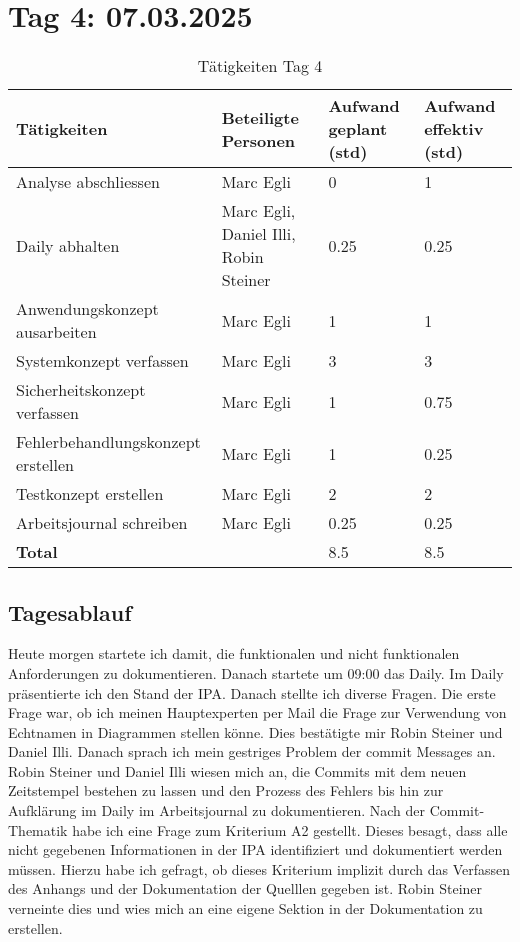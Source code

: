 \section{Tag 4: 07.03.2025}
\begin{table}[H]
    \begin{tabular}{|L{0.4\textwidth}|C{60pt}|C{60pt}|C{60pt}|}
        \hline
        \color{white}Tätigkeiten & \color{white}Beteiligte \color{white}Personen & \color{white}Aufwand geplant (std) & \color{white}Aufwand effektiv (std) \\
        \hline
        Analyse abschliessen & Marc Egli & 0 & 1 \\
        \hline
        Daily abhalten & Marc Egli, Daniel Illi, Robin Steiner & 0.25 & 0.25 \\
        \hline
        Anwendungskonzept ausarbeiten & Marc Egli & 1 & 1 \\
        \hline
        Systemkonzept verfassen & Marc Egli & 3 & 3 \\
        \hline
        Sicherheitskonzept verfassen & Marc Egli & 1 & 0.75 \\
        \hline
        Fehlerbehandlungskonzept erstellen & Marc Egli & 1 & 0.25 \\
        \hline
        Testkonzept erstellen & Marc Egli & 2 & 2 \\
        \hline
        Arbeitsjournal schreiben & Marc Egli & 0.25 & 0.25 \\
        \hline
        \textbf{Total} &  & 8.5 & 8.5 \\
    \hline
    \end{tabular}
    \caption{Tätigkeiten Tag 4}
\end{table}

\subsection*{Tagesablauf}
Heute morgen startete ich damit, die funktionalen und nicht funktionalen Anforderungen zu dokumentieren. 
Danach startete um 09:00 das Daily. Im Daily präsentierte ich den Stand der IPA. Danach stellte ich diverse Fragen. Die
erste Frage war, ob ich meinen Hauptexperten per Mail die Frage zur Verwendung von Echtnamen in Diagrammen stellen könne. Dies
bestätigte mir Robin Steiner und Daniel Illi. Danach sprach ich mein gestriges Problem der commit Messages an. Robin Steiner und Daniel Illi
wiesen mich an, die Commits mit dem neuen Zeitstempel bestehen zu lassen und den Prozess des Fehlers bis hin zur Aufklärung im Daily
im Arbeitsjournal zu dokumentieren. Nach der Commit-Thematik habe ich eine Frage zum Kriterium A2 gestellt. Dieses besagt, dass alle
nicht gegebenen Informationen in der IPA identifiziert und dokumentiert werden müssen. Hierzu habe ich gefragt, ob dieses Kriterium implizit durch das
Verfassen des Anhangs und der Dokumentation der Quelllen gegeben ist. Robin Steiner verneinte dies und wies mich an eine eigene Sektion in der Dokumentation
zu erstellen.

